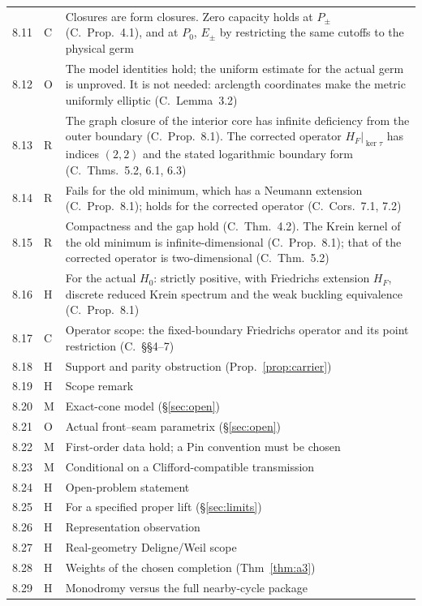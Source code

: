 \documentclass[11pt]{article}
\theoremstyle{definition}\newtheorem{definition}[theorem]{Definition}
\theoremstyle{remark}\newtheorem{remark}[theorem]{Remark}
\begin{document}
{\begin{longtable}{@{}l>{\raggedright\arraybackslash}p{.06\linewidth}>{\raggedright\arraybackslash}p{.72\linewidth}@{}}
8.11 & C & Closures are form closures. Zero capacity holds at $P_\pm$ (C.\ Prop.~4.1), and at $P_0$, $E_\pm$ by restricting the same cutoffs to the physical germ\\
8.12 & O & The model identities hold; the uniform estimate for the actual germ is unproved. It is not needed: arclength coordinates make the metric uniformly elliptic (C.\ Lemma~3.2)\\
8.13 & R & The graph closure of the interior core has infinite deficiency from the outer boundary (C.\ Prop.~8.1). The corrected operator $H_F|_{\ker\tau}$ has indices $(2,2)$ and the stated logarithmic boundary form (C.\ Thms.~5.2, 6.1, 6.3)\\
8.14 & R & Fails for the old minimum, which has a Neumann extension (C.\ Prop.~8.1); holds for the corrected operator (C.\ Cors.~7.1, 7.2)\\
8.15 & R & Compactness and the gap hold (C.\ Thm.~4.2). The Krein kernel of the old minimum is infinite-dimensional (C.\ Prop.~8.1); that of the corrected operator is two-dimensional (C.\ Thm.~5.2)\\
8.16 & H & For the actual $H_0$: strictly positive, with Friedrichs extension $H_F$, discrete reduced Krein spectrum and the weak buckling equivalence (C.\ Prop.~8.1)\\
8.17 & C & Operator scope: the fixed-boundary Friedrichs operator and its point restriction (C.\ \S\S4--7)\\
8.18 & H & Support and parity obstruction (Prop.~\ref{prop:carrier})\\
8.19 & H & Scope remark\\
8.20 & M & Exact-cone model (\S\ref{sec:open})\\
8.21 & O & Actual front--seam parametrix (\S\ref{sec:open})\\
8.22 & M & First-order data hold; a Pin convention must be chosen\\
8.23 & M & Conditional on a Clifford-compatible transmission\\
8.24 & H & Open-problem statement\\
8.25 & H & For a specified proper lift (\S\ref{sec:limits})\\
8.26 & H & Representation observation\\
8.27 & H & Real-geometry Deligne/Weil scope\\
8.28 & H & Weights of the chosen completion (Thm~\ref{thm:a3})\\
8.29 & H & Monodromy versus the full nearby-cycle package\\

\end{longtable}}
\end{document}
